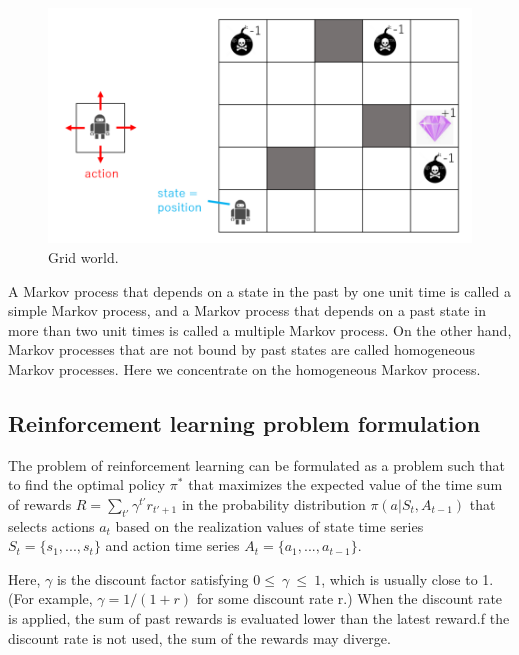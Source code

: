 \begin{figure}[H]
\begin{center}
\includegraphics[width=14cm]{./figures/example_gridworld.png}
\caption{Grid world.}
\label{fig:example_gridworld}
\end{center}
\end{figure}

A Markov process that depends on a state in the past by one unit time is called a simple Markov process, and a Markov process that depends on a past state in more than two unit times is called a multiple Markov process. On the other hand, Markov processes that are not bound by past states are called homogeneous Markov processes. Here we concentrate on the homogeneous Markov process.


\subsection{Reinforcement learning problem formulation}

The problem of reinforcement learning can be formulated as a problem such that to find the optimal policy $\pi^{*}$ that maximizes the expected value of the time sum of rewards $R = \sum_{t'} \gamma^{t'} r_{t'+1}$ in the probability distribution $\pi(a|S_t,A_{t-1})$ that selects actions $a_t$ based on the realization values ​​of state time series $S_t = \{ s_1, ... , s_t\}$ and action time series $A_t = \{ a_1, ... , a_{t-1}\}$.

Here, $\gamma$ is the discount factor satisfying $0\leq \ \gamma \ \leq \ 1$, which is usually close to 1. (For example, $\gamma =1/(1+r)$ for some discount rate r.)
When the discount rate is applied, the sum of past rewards is evaluated lower than the latest reward.f the discount rate is not used, the sum of the rewards may diverge.

